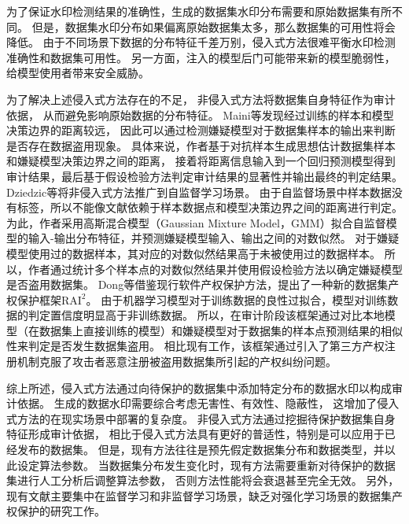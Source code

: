 为了保证水印检测结果的准确性，生成的数据集水印分布需要和原始数据集有所不同。
但是，数据集水印分布如果偏离原始数据集太多，那么数据集的可用性将会降低。
由于不同场景下数据的分布特征千差万别，侵入式方法很难平衡水印检测准确性和数据集可用性。
另一方面，注入的模型后门可能带来新的模型脆弱性\cite{DBLP:journals/corr/abs-2210-00875}，
给模型使用者带来安全威胁。

为了解决上述侵入式方法存在的不足，
非侵入式方法将数据集自身特征作为审计依据，
从而避免影响原始数据的分布特征。
Maini等\cite{DBLP:conf/iclr/MainiYP21}发现经过训练的样本和模型决策边界的距离较远，
因此可以通过检测嫌疑模型对于数据集样本的输出来判断是否存在数据盗用现象。
具体来说，作者基于对抗样本生成思想\cite{DBLP:journals/corr/SzegedyZSBEGF13}估计数据集样本和嫌疑模型决策边界之间的距离，
接着将距离信息输入到一个回归预测模型得到审计结果，最后基于假设检验方法判定审计结果的显著性并输出最终的判定结果。
Dziedzic等\cite{DBLP:journals/corr/abs-2209-09024}将非侵入式方法推广到自监督学习场景。
由于自监督场景中样本数据没有标签，所以不能像文献{\rm\parencite{DBLP:journals/corr/SzegedyZSBEGF13}}依赖于样本数据点和模型决策边界之间的距离进行判定。
为此，作者采用高斯混合模型（Gaussian Mixture Model，GMM）拟合自监督模型的输入-输出分布特征，并预测嫌疑模型输入、输出之间的对数似然。
对于嫌疑模型使用过的数据样本，其对应的对数似然结果高于未被使用过的数据样本。
所以，作者通过统计多个样本点的对数似然结果并使用假设检验方法以确定嫌疑模型是否盗用数据集。
Dong等\cite{DBLP:conf/ndss/DongLCXZ023}借鉴现行软件产权保护方法，提出了一种新的数据集产权保护框架$\text{RAI}^2$。
由于机器学习模型对于训练数据的良性过拟合\cite{DBLP:conf/iclr/SanyalDKT21, DBLP:journals/jmlr/ChatterjiL21, bartlett2020benign}，模型对训练数据的判定置信度明显高于非训练数据。
所以，在审计阶段该框架通过对比本地模型（在数据集上直接训练的模型）和嫌疑模型对于数据集的样本点预测结果的相似性来判定是否发生数据集盗用。
相比现有工作，该框架通过引入了第三方产权注册机制克服了攻击者恶意注册被盗用数据集所引起的产权纠纷问题。

综上所述，侵入式方法通过向待保护的数据集中添加特定分布的数据水印以构成审计依据。
生成的数据水印需要综合考虑无害性、有效性、隐蔽性，
这增加了侵入式方法的在现实场景中部署的复杂度。
非侵入式方法通过挖掘待保护数据集自身特征形成审计依据，
相比于侵入式方法具有更好的普适性，特别是可以应用于已经发布的数据集。
但是，现有方法往往是预先假定数据集分布和数据类型，并以此设定算法参数。
当数据集分布发生变化时，现有方法需要重新对待保护的数据集进行人工分析后调整算法参数，
否则方法性能将会衰退甚至完全无效。
另外，现有文献主要集中在监督学习和非监督学习场景，缺乏对强化学习场景的数据集产权保护的研究工作。


